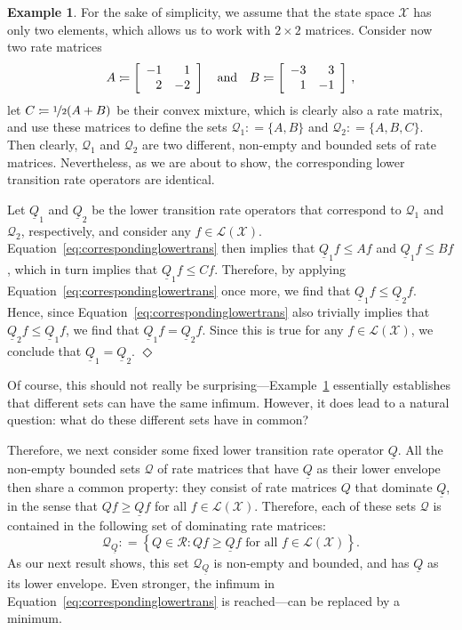 \documentclass[10pt,a4paper]{paper}
\theoremstyle{definition}
\newtheorem{exmp}{Example}%
\newcommand{\states}{\mathcal{X}}
\newcommand{\gambles}{\mathcal{L}}
\newcommand{\gamblesX}{\gambles(\states)}
\newcommand{\rateset}{\mathcal{Q}}
\newcommand{\lrate}{\underline{Q}}
\newcommand{\coloneqq}{:\!=}
\newcommand{\exampleend}{\hfill$\Diamond$}
\begin{document}
\begin{exmp}\label{example:different_sets_same_lower_rate}
For the sake of simplicity, we assume that the state space $\states$ has only two elements, which allows us to work with $2\times 2$ matrices. Consider now two rate matrices
\begin{equation*}
A\coloneqq\left[\begin{array}{rr}-1 & 1 \\2 & -2\end{array}\right]\quad\text{and}\quad
B\coloneqq\left[\begin{array}{rr}-3 & 3 \\1 & -1\end{array}\right]\,,
\vspace{7pt}
\end{equation*}
let $C\coloneqq \nicefrac{1}{2}(A+B)$ be their convex mixture, which is clearly also a rate matrix, and use these matrices to define the sets $\rateset_1\coloneqq\{A,B\}$ and $\rateset_2\coloneqq\{A,B,C\}$. Then clearly, $\rateset_1$ and $\rateset_2$ are two different, non-empty and bounded sets of rate matrices. Nevertheless, as we are about to show, the corresponding lower transition rate operators are identical.

Let $\lrate_1$ and $\lrate_2$ be the lower transition rate operators that correspond to $\rateset_1$ and $\rateset_2$, respectively, %
and consider any $f\in\gamblesX$. Equation~\eqref{eq:correspondinglowertrans} then implies that $\lrate_1f\leq Af$ and $\lrate_1f\leq Bf$, which in turn implies that $\lrate_1f\leq Cf$. Therefore, by applying Equation~\eqref{eq:correspondinglowertrans} once more, we find that $\lrate_1 f\leq\lrate_2 f$. Hence, since Equation~\eqref{eq:correspondinglowertrans} also trivially implies that $\lrate_2 f\leq\lrate_1 f$, we find that $\lrate_1 f=\lrate_2 f$. Since this is true for any $f\in\gamblesX$, we conclude that $\lrate_1=\lrate_2$.
\exampleend
\end{exmp}
Of course, this should not really be surprising---Example~\ref{example:different_sets_same_lower_rate} essentially establishes that different sets can have the same infimum. However, it does lead to a natural question: what do these different sets have in common?

Therefore, we next consider some fixed lower transition rate operator $\lrate$.
All the non-empty bounded sets $\rateset$ of rate matrices that have $\lrate$ as their lower envelope then share a common property: they consist of rate matrices $Q$ that dominate $\lrate$, in the sense that $Qf\geq\lrate f$ for all $f\in\gamblesX$. Therefore, each of these sets $\rateset$ is contained in the following set of dominating rate matrices:
\begin{equation}\label{eq:dominatingratematrices}
\rateset_{\lrate}\coloneqq
\left\{
Q\in\mathcal{R}
\colon
Qf\geq\lrate f\text{ for all $f\in\gamblesX$}
\right\}.
\end{equation}
As our next result shows, this set $\rateset_{\lrate}$ is non-empty and bounded, and has $\lrate$ as its lower envelope. Even stronger, the infimum in Equation~\eqref{eq:correspondinglowertrans} is reached---can be replaced by a minimum.
\end{document}
